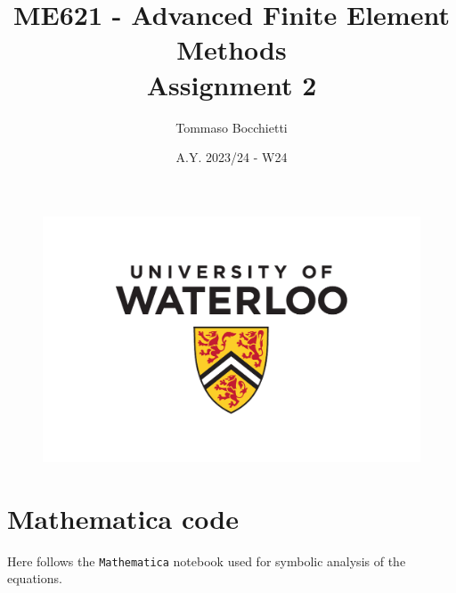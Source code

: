 \documentclass{../../commons/assignment}
\begin{document}
\graphicspath{{./img/}}


\title{ME621 - Advanced Finite Element Methods \\ Assignment 2}
\author{Tommaso Bocchietti}
\date{A.Y. 2023/24 - W24}

\maketitle

\begin{figure}[H]
    \centering
    \includegraphics[width=.9\textwidth]{./pdf/UniversityOfWaterloo_logo_vert_pms}
    \label{fig:University_Of_Waterloo_logo}
\end{figure}

\clearpage
\tableofcontents
\listoffigures
\listoftables
\clearpage








\clearpage
\appendix
\section{Mathematica code}
\label{sec:appendix}

Here follows the \texttt{Mathematica} notebook used for symbolic analysis of the equations.


\end{document}
